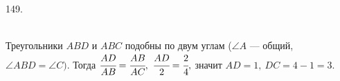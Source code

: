 149. \begin{figure}[ht!]
\end{figure}\\
Треугольники $ABD$ и $ABC$ подобны по двум углам ($\angle A$ --- общий, $\angle ABD=\angle C).$ Тогда $\cfrac{AD}{AB}=\cfrac{AB}{AC},\ \cfrac{AD}{2}=\cfrac{2}{4},$ значит $AD=1,\ DC=4-1=3.$\\
